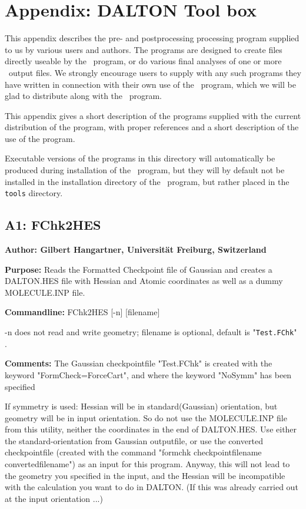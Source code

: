 \section*{Appendix: DALTON Tool box}

This appendix describes the pre- and postprocessing processing program
supplied to us by various users and authors. The programs are designed
to create files directly useable by the \siraba\ program, or do
various final analyses of one or more \siraba\ output files. We
strongly encourage users to supply with any such programs they have
written in connection with their own use of the \siraba\ program,
which we will be glad to distribute along with the \siraba\
program.

This appendix gives a short description of the programs supplied with
the current distribution of the program, with proper references and a
short description of the use of the program.

Executable versions of the programs in this directory will
automatically be produced during installation of the \siraba\ program,
but they will by default not be installed in the installation
directory of the \siraba\ program, but rather placed in the
\verb|tools| directory.

\subsection*{A1: FChk2HES}

\noindent
{\large\bf Author: \normalsize\large Gilbert Hangartner,
Universit\"{a}t Freiburg, Switzerland}

\smallskip

\noindent 
{\bf Purpose:} Reads the Formatted Checkpoint file of Gaussian  
     and creates a DALTON.HES file with Hessian and Atomic coordinates
     as well as a dummy MOLECULE.INP file.

\smallskip
\noindent
{\bf Commandline:} FChk2HES [-n] [filename]

-n does not read and write geometry; filename is optional, default is
"\verb|Test.FChk|" .

\smallskip
\noindent
{\bf Comments:}     The Gaussian checkpointfile "Test.FChk" is created
     with the keyword "FormCheck=ForceCart", and where the keyword "NoSymm"
     has  been specified

If symmetry is used: Hessian will be in standard(Gaussian) orientation,
        but geometry will be in input orientation. So do not use the
        MOLECULE.INP file from this utility, neither the coordinates in the
        end of DALTON.HES.
        Use either the standard-orientation from Gaussian outputfile, or
        use the converted checkpointfile (created with the command
        "formchk checkpointfilename convertedfilename") as an input for
        this program. Anyway, this will not lead to the geometry you 
        specified in the input, and the Hessian will be incompatible with the
        calculation you want to do in DALTON. (If this was already carried
        out at the input orientation ...)

